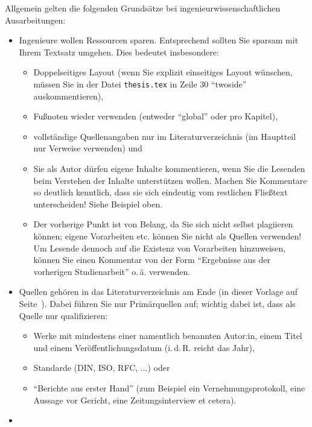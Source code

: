 \noindent Allgemein gelten die folgenden Grundsätze bei ingenieurwissenschaftlichen Ausarbeitungen:
\begin{itemize}
    \item{
        Ingenieure wollen Ressourcen sparen. Entsprechend sollten Sie sparsam mit Ihrem Textsatz umgehen. Dies bedeutet insbesondere:
        \begin{itemize}
            \item Doppelseitiges Layout (wenn Sie explizit einseitiges Layout wünschen, müssen Sie in der Datei \texttt{thesis.tex} in Zeile $30$ \enquote{twoside} auskommentieren),
            \item Fußnoten wieder verwenden (entweder \enquote{global} oder pro Kapitel),
            \item vollständige Quellenangaben nur im Literaturverzeichnis (im Hauptteil nur Verweise verwenden) und
            \item Sie als Autor dürfen eigene Inhalte kommentieren, wenn Sie die Lesenden beim Verstehen der Inhalte unterstützen wollen. Machen Sie Kommentare so deutlich kenntlich, dass sie sich eindeutig vom restlichen Fließtext unterscheiden! Siehe Beispiel oben.
            \item Der vorherige Punkt ist von Belang, da Sie sich nicht selbst plagiieren können; eigene Vorarbeiten etc. können Sie nicht als Quellen verwenden! Um Lesende dennoch auf die Existenz von Vorarbeiten hinzuweisen, können Sie einen Kommentar von der Form \enquote{Ergebnisse aus der vorherigen Studienarbeit} o.\,ä. verwenden.
        \end{itemize}
    }
    \item{
        Quellen gehören in das Literaturverzeichnis am Ende (in dieser Vorlage auf Seite~\pageref{Bibliography}). Dabei führen Sie nur Primärquellen auf; wichtig dabei ist, dass als Quelle nur qualifizieren:
        \begin{itemize}
            \item Werke mit mindestens einer namentlich benannten Autor:in, einem Titel und einem Veröffentlichungsdatum (i.\,d.\,R. reicht das Jahr),
            \item Standarde (DIN, ISO, RFC, $\ldots$) oder
            \item \enquote{Berichte aus erster Hand} (zum Beispiel ein Vernehmungsprotokoll, eine Aussage vor Gericht, eine Zeitungsinterview et cetera).
        \end{itemize}
    }
    \item{
}
\end{itemize}
